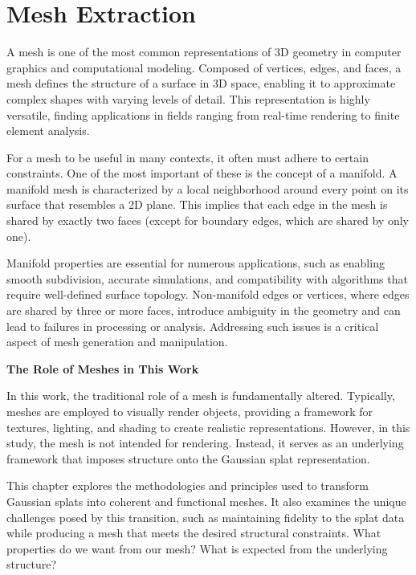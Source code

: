 \chapter{Mesh Extraction}

\label{mesh-extraction}

A mesh is one of the most common representations of 3D geometry in computer graphics and computational modeling. Composed of vertices, edges, and faces, a mesh defines the structure of a surface in 3D space, enabling it to approximate complex shapes with varying levels of detail. This representation is highly versatile, finding applications in fields ranging from real-time rendering to finite element analysis.

For a mesh to be useful in many contexts, it often must adhere to certain constraints. One of the most important of these is the concept of a manifold. A manifold mesh is characterized by a local neighborhood around every point on its surface that resembles a 2D plane. This implies that each edge in the mesh is shared by exactly two faces (except for boundary edges, which are shared by only one).

Manifold properties are essential for numerous applications, such as enabling smooth subdivision, accurate simulations, and compatibility with algorithms that require well-defined surface topology. Non-manifold edges or vertices, where edges are shared by three or more faces, introduce ambiguity in the geometry and can lead to failures in processing or analysis. Addressing such issues is a critical aspect of mesh generation and manipulation.

\textbf {The Role of Meshes in This Work}

In this work, the traditional role of a mesh is fundamentally altered. Typically, meshes are employed to visually render objects, providing a framework for textures, lighting, and shading to create realistic representations. However, in this study, the mesh is not intended for rendering. Instead, it serves as an underlying framework that imposes structure onto the Gaussian splat representation.

This chapter explores the methodologies and principles used to transform Gaussian splats into coherent and functional meshes. It also examines the unique challenges posed by this transition, such as maintaining fidelity to the splat data while producing a mesh that meets the desired structural constraints.
What properties do we want from our mesh?
What is expected from the underlying structure?

